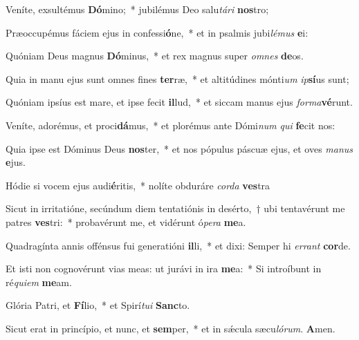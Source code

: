 \item Veníte, exsultémus \textbf{Dó}mino;~* jubilémus Deo salu\textit{tá}\textit{ri} \textbf{nos}tro;

\item Præoccupémus fáciem ejus in confessi\textbf{ó}ne,~* et in psalmis jubi\textit{lé}\textit{mus} \textbf{e}i:

\item Quóniam Deus magnus \textbf{Dó}minus,~* et rex magnus super \textit{om}\textit{nes} \textbf{de}os.

\item Quia in manu ejus sunt omnes fines \textbf{ter}ræ,~* et altitúdines mónti\textit{um} \textit{ip}\textbf{sí}us sunt;

\item Quóniam ipsíus est mare, et ipse fecit \textbf{il}lud,~* et siccam manus ejus \textit{for}\textit{ma}\textbf{vé}runt.

\item Veníte, adorémus, et proci\textbf{dá}mus,~* et plorémus ante Dómi\textit{num} \textit{qui} \textbf{fe}cit nos:

\item Quia ipse est Dóminus Deus \textbf{nos}ter,~* et nos pópulus páscuæ ejus, et oves \textit{ma}\textit{nus} \textbf{e}jus.

\item Hódie si vocem ejus audi\textbf{é}ritis,~* nolíte obduráre \textit{cor}\textit{da} \textbf{ves}tra

\item Sicut in irritatióne, secúndum diem tentatiónis in desérto,~† ubi tentavérunt me patres \textbf{ves}tri:~* probavérunt me, et vidérunt ó\textit{pe}\textit{ra} \textbf{me}a.

\item Quadragínta annis offénsus fui generatióni \textbf{il}li,~* et dixi: Semper hi \textit{er}\textit{rant} \textbf{cor}de.

\item Et isti non cognovérunt vias meas: ut jurávi in ira \textbf{me}a:~* Si introíbunt in ré\textit{qui}\textit{em} \textbf{me}am.

\item Glória Patri, et \textbf{Fí}lio,~* et Spirí\textit{tu}\textit{i} \textbf{Sanc}to.

\item Sicut erat in princípio, et nunc, et \textbf{sem}per,~* et in sǽcula sæcu\textit{ló}\textit{rum}. \textbf{A}men.
